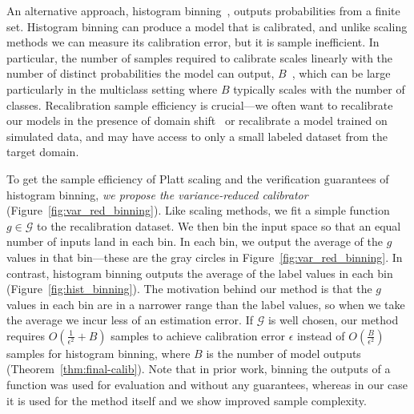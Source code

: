 An alternative approach, histogram binning~\cite{zadrozny2001calibrated}, outputs probabilities from a finite set.
Histogram binning can produce a model that is calibrated, and unlike scaling methods we can measure its calibration error, but it is sample inefficient.
In particular, the number of samples required to calibrate scales linearly with the number of distinct probabilities the model can output, $B$~\cite{naeini2014binary}, which can be large particularly in the multiclass setting where $B$ typically scales with the number of classes.
Recalibration sample efficiency is crucial---we often want to recalibrate our models in the presence of domain shift~\cite{hendrycks2019anomaly} or recalibrate a model trained on simulated data, and may have access to only a small labeled dataset from the target domain.

To get the sample efficiency of Platt scaling and the verification guarantees of histogram binning, \emph{we propose the variance-reduced calibrator} (Figure~\ref{fig:var_red_binning}).
Like scaling methods, we fit a simple function $g \in \mathcal{G}$ to the recalibration dataset.
We then bin the input space so that an equal number of inputs land in each bin.
In each bin, we output the average of the $g$ values in that bin---these are the gray circles in Figure~\ref{fig:var_red_binning}.
In contrast, histogram binning outputs the average of the label values in each bin (Figure~\ref{fig:hist_binning}).
The motivation behind our method is that the $g$ values in each bin are in a narrower range than the label values, so when we take the average we incur less of an estimation error.
If $\mathcal{G}$ is well chosen, our method requires $O(\frac{1}{\epsilon^2} + B)$ samples to achieve calibration error $\epsilon$ instead of $O(\frac{B}{\epsilon^2})$ samples for histogram binning, where $B$ is the number of model outputs (Theorem~\ref{thm:final-calib}). Note that in prior work, binning the outputs of a function was used for evaluation and without any guarantees, whereas in our case it is used for the method itself and we show improved sample complexity.

